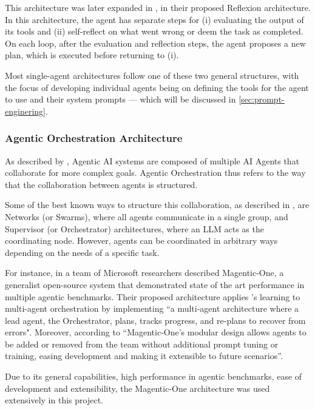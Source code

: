 \documentclass[a4paper]{report}
\begin{document}
This architecture was later expanded in \cite{shinn2023reflexion}, in their proposed Reflexion architecture. In this architecture, the agent has separate steps for (i) evaluating the output of its tools and (ii) self-reflect on what went wrong or deem the task as completed. On each loop, after the evaluation and reflection steps, the agent proposes a new plan, which is executed before returning to (i).

Most single-agent architectures follow one of these two general structures, with the focus of developing individual agents being on defining the tools for the agent to use and their system prompts --- which will be discussed in \autoref{sec:prompt-enginering}.

\subsubsection{Agentic Orchestration Architecture}

As described by \cite{sapkota2025aiagentsvsagentic}, Agentic AI systems are composed of multiple AI Agents that collaborate for more complex goals. Agentic Orchestration thus refers to the way that the collaboration between agents is structured.

Some of the best known ways to structure this collaboration, as described in \cite{langgraphagmultiagentsystems}, are Networks (or Swarms), where all agents communicate in a single group, and Supervisor (or Orchestrator) architectures, where an LLM acts as the coordinating node. However, agents can be coordinated in arbitrary ways depending on the needs of a specific task.

For instance, in \cite{fourney2024magenticone} a team of Microsoft researchers described Magentic-One, a generalist open-source system that demonstrated state of the art performance in multiple agentic benchmarks. Their proposed architecture applies \cite{shinn2023reflexion}'s learning to multi-agent orchestration by implementing ``a multi-agent architecture where a lead agent, the Orchestrator, plans, tracks progress, and re-plans to recover from errors". Moreover, according to \cite{fourney2024magenticone} ``Magentic-One's modular design allows agents to be added or removed from the team without additional prompt tuning or training, easing development and making it extensible to future scenarios''.

Due to its general capabilities, high performance in agentic benchmarks, ease of development and extensibility, the Magentic-One architecture was used extensively in this project.
\end{document}
